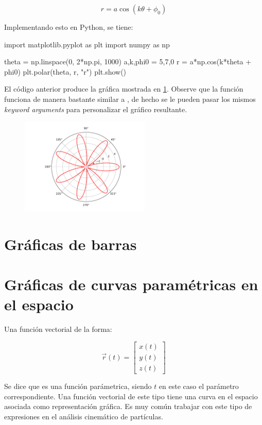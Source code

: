 $$ r = a \cos\left( k\theta + \phi_0 \right) $$

Implementando esto en Python, se tiene:

\begin{python}
import matplotlib.pyplot as plt
import numpy as np

theta = np.linspace(0, 2*np.pi, 1000)
a,k,phi0 = 5,7,0
r = a*np.cos(k*theta + phi0)
plt.polar(theta, r, "r")
plt.show()
\end{python}

El código anterior produce la gráfica mostrada en \ref{fig:polar_01}. Observe que la función  
funciona de manera bastante similar a , de hecho se le pueden pasar los mismos 
\textit{keyword arguments} para personalizar el gráfico resultante.

\begin{figure}[H]
	\centering
	\includegraphics[width=0.55\textwidth]{img/ch03/polar_01.pdf}
	\caption{}
	\label{fig:polar_01}
\end{figure}


\section{Gráficas de barras}



\section{Gráficas de curvas paramétricas en el espacio}

Una función vectorial de la forma: 

$$ \vec{r}(t) = \begin{bmatrix}
x(t) \\ y(t) \\ z(t)
\end{bmatrix} $$

Se dice que es una función parámetrica, siendo $t$ en este caso el parámetro correspondiente. Una función vectorial 
de este tipo tiene una curva en el espacio asociada como representación gráfica. Es muy común 
trabajar con este tipo de expresiones en el análisis cinemático de partículas.

